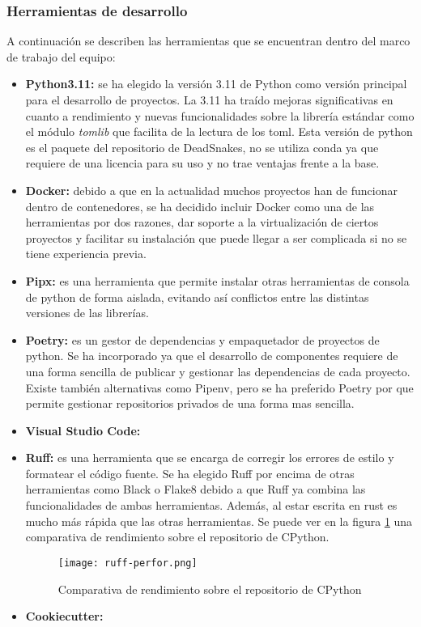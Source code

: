\subsubsection{Herramientas de desarrollo}
A continuación se describen las herramientas que se encuentran dentro del marco
de trabajo del equipo:
\begin{itemize}
    \item \textbf{Python3.11:} se ha elegido la versión 3.11 de Python como versión
    principal para el desarrollo de proyectos. La 3.11 ha traído mejoras significativas
    en cuanto a rendimiento y nuevas funcionalidades sobre la librería estándar como
    el módulo \textit{tomlib} que facilita de la lectura de los toml. Esta versión
    de python es el paquete del repositorio de DeadSnakes, no se utiliza conda ya
    que requiere de una licencia para su uso y no trae ventajas frente a la base.
    \item \textbf{Docker:} debido a que en la actualidad muchos proyectos han de funcionar
    dentro de contenedores, se ha decidido incluir Docker como una de las herramientas por
    dos razones, dar soporte a la virtualización de ciertos proyectos y facilitar su instalación
    que puede llegar a ser complicada si no se tiene experiencia previa.
    \item \textbf{Pipx:} es una herramienta que permite instalar otras herramientas de 
    consola de python de forma aislada, evitando así conflictos entre las distintas 
    versiones de las librerías.
    \item \textbf{Poetry:} es un gestor de dependencias y empaquetador de proyectos de python.
    Se ha incorporado ya que el desarrollo de componentes requiere de una forma sencilla de
    publicar y gestionar las dependencias de cada proyecto. Existe también alternativas como
    Pipenv, pero se ha preferido Poetry por que permite gestionar repositorios privados de una
    forma mas sencilla.  
    \item \textbf{Visual Studio Code:} 
    \item \textbf{Ruff:} es una herramienta que se encarga de corregir los errores de estilo
    y formatear el código fuente. Se ha elegido Ruff por encima de otras herramientas como
    Black o Flake8 debido a que Ruff ya combina las funcionalidades de ambas herramientas. Además,
    al estar escrita en rust es mucho más rápida que las otras herramientas. Se puede ver en la 
    figura \ref{fig:ruff-perfor} una comparativa de rendimiento \cite{astralRuff} sobre el repositorio de CPython.
    \begin{figure}[ht]
        \centering
        \texttt{[image: ruff-perfor.png]}
        \caption{Comparativa de rendimiento sobre el repositorio de CPython}\label{fig:ruff-perfor}
    \end{figure}
    \item \textbf{Cookiecutter:} 
\end{itemize}

